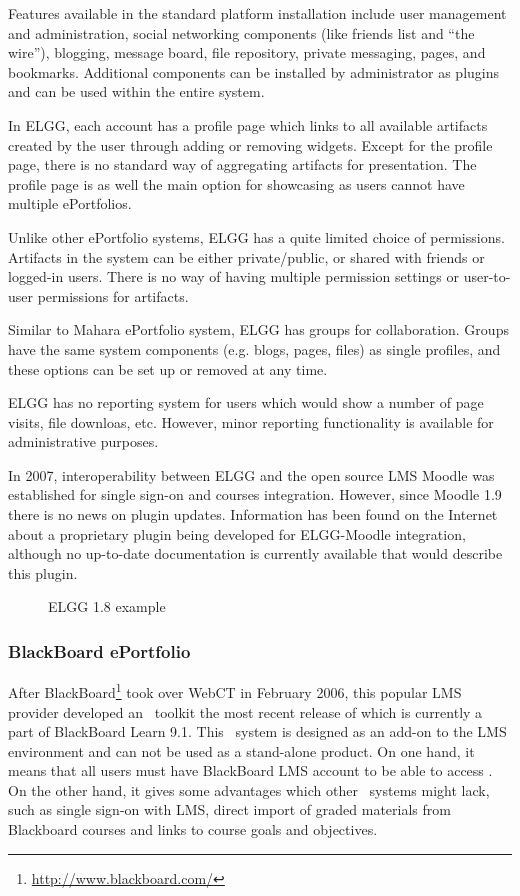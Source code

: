 Features available in the standard platform installation include user management
and administration, social networking components (like friends list and ``the
wire''), blogging, message board, file repository, private messaging, pages, and
bookmarks. Additional components can be installed by administrator as plugins
and can be used within the entire system.

In ELGG, each account has a profile page which links to all available artifacts
created by the user through adding or removing widgets. Except for the profile
page, there is no standard way of aggregating artifacts for presentation.
The profile page is as well the main option for showcasing as users cannot have
multiple ePortfolios.

Unlike other ePortfolio systems, ELGG has a quite limited choice of permissions.
Artifacts in the system can be either private/public, or shared with friends
or logged-in users. There is no way of having multiple permission settings or
user-to-user permissions for artifacts.

Similar to Mahara ePortfolio system, ELGG has groups for collaboration. Groups
have the same system components (e.g. blogs, pages, files) as single profiles,
and these options can be set up or removed at any time.

ELGG has no reporting system for users which would show a number of page
visits, file downloas, etc. However, minor reporting functionality is available
for administrative purposes.

In 2007, interoperability between ELGG and the open source LMS Moodle was
established for single sign-on and courses integration. However, since Moodle
1.9 there is no news on plugin updates. Information has been found on the
Internet about a proprietary plugin being developed for ELGG-Moodle integration,
although no up-to-date documentation is currently available that would describe
this plugin.

\begin{figure}[htb]
\centering
\setlength\fboxsep{0pt}
\setlength\fboxrule{0.5pt}
\caption{ELGG 1.8 example}
\label{fig:elgg}
\end{figure}

\subsubsection{BlackBoard ePortfolio}
After BlackBoard\footnote{\url{http://www.blackboard.com/}} took over WebCT in
February 2006, this popular LMS provider developed an \ep~toolkit the most
recent release of which is currently a part of BlackBoard Learn 9.1. This
\ep~system is designed as an add-on to the LMS environment and can not be used
as a stand-alone product. On one hand, it means that all users must have
BlackBoard LMS account to be able to access \ep. On the other hand, it gives
some advantages which other \ep~systems might lack, such as single sign-on with
LMS, direct import of graded materials from Blackboard courses and links to
course goals and objectives.

